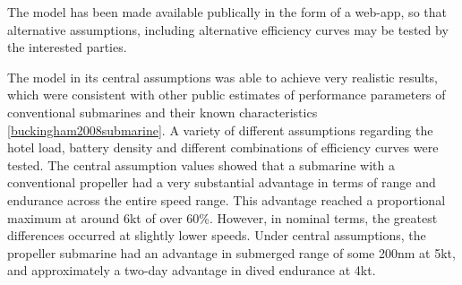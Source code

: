 \documentclass{article}\usepackage[]{graphicx}\usepackage[]{color}
\begin{document}
The model has been made available publically in the form of a web-app, so that alternative assumptions, including alternative efficiency curves may be tested by the interested parties.

The model in its central assumptions was able to achieve very realistic results, which were consistent with other public estimates of performance parameters of conventional submarines and their known characteristics \ref{buckingham2008submarine}.  A variety of different assumptions regarding the hotel load, battery density and different combinations of efficiency curves were tested.  The central assumption values showed that a submarine with a conventional propeller had a very substantial advantage in terms of range and endurance across the entire speed range.  This advantage reached a proportional maximum at around 6kt of over 60\%.  However, in nominal terms, the greatest differences occurred at slightly lower speeds.  Under central assumptions, the propeller submarine had an advantage in submerged range of some 200nm at 5kt, and approximately a two-day advantage in dived endurance at 4kt.
\end{document}
